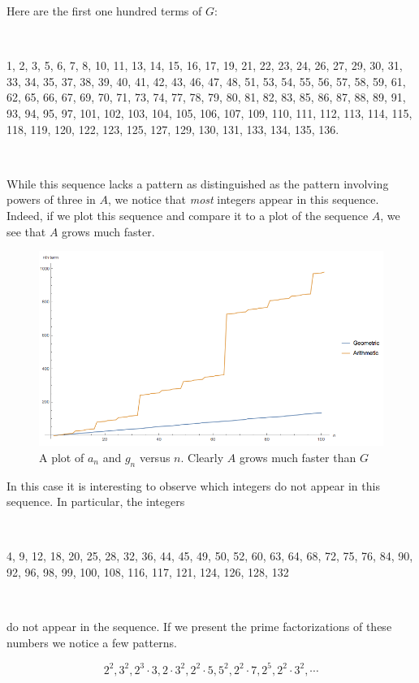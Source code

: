 \documentclass[11pt,letterpaper,twoside,english]{article}
\theoremstyle{theorem}
\theoremstyle{remark}
\begin{document}
Here are the first one hundred terms of $G$: 

\

1, 2, 3, 5, 6, 7, 8, 10, 11, 13, 14, 15, 16, 17, 19, 21, 22, 23, 24, 26, 27, 29, 30, 31, 33, 34, 35, 37, 38, 39, 40, 41, 42, 43, 46, 47, 48, 51, 53, 54, 55, 56, 57, 58, 59, 61, 62, 65, 66, 67, 69, 70, 71, 73, 74, 77, 78, 79, 80, 81, 82, 83, 85, 86, 87, 88, 89, 91, 93, 94, 95, 97, 101, 102, 103, 104, 105, 106, 107, 109, 110, 111, 112, 113, 114, 115, 118, 119, 120, 122, 123, 125, 127, 129, 130, 131, 133, 134, 135, 136.

\

While this sequence lacks a pattern as distinguished as the pattern involving powers of three in $A$, we notice that {\itshape{most}} integers appear in this sequence. Indeed, if we plot this sequence and compare it to a plot of the sequence $A$, we see that $A$ grows much faster. 


\begin{figure}[!h]
  \centering
    \includegraphics[resolution=120]{GvsS.png}
    \caption{A plot of $a_n$ and $g_n$ versus $n$. Clearly $A$ grows much faster than $G$}
\end{figure}


In this case it is interesting to observe which integers do not appear in this sequence. In particular, the integers 

\

4, 9, 12, 18, 20, 25, 28, 32, 36, 44, 45, 49, 50, 52, 60, 63, 64, 68, 72, 75, 76, 84, 90, 92, 96, 98, 99, 100, 108, 116, 117, 121, 124, 126, 128, 132

\

do not appear in the sequence. If we present the prime factorizations of these numbers we notice a few patterns.

$$
2^2, 3^2, 2^3\cdot 3, 2\cdot3^2, 2^2\cdot 5, 5^2, 2^2\cdot7, 2^5, 2^2\cdot 3^2,\cdots
$$
\end{document}
